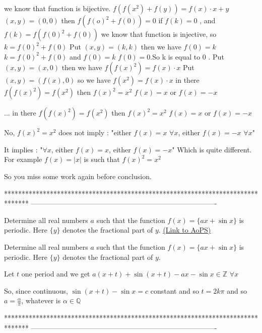 \begin{solution}
	we know that function is bijective.
$  f(f(x^2) + f(y)) = f(x) \cdot x +y  $
$  (x,y) = (0,0) $ then  $ f(f(o)^2 + f(0)) =0 $
if $ f(k)= 0 $ , and $ f(k) = f(f(0)^2 + f(0)) $ we know that function is injective, so  $ k= f(0)^2 + f(0)  $
Put $ (x,y) = (k,k) $ then we have  $ f(0) = k $ 
 $ k= f(0)^2 + f(0)  $ and  $ f(0) =k $
$ f(0)= 0 $.So k is equal to 0 .
    Put $ (x,y) = (x,0) $ then we have 
$ f(f(x)^2)= f(x) \cdot x $  
    Put    $ (x,y) =(f(x) ,0) $ so we have $ f(x^2)= f(x) \cdot x $
in there $ f(f(x)^2) = f(x^2) $  then   $ f(x)^2 = x^2  $ 
$ f(x) = x $ or $ f(x) =-x $
\end{solution}



\begin{solution}
	\begin{tcolorbox}...
in there $ f(f(x)^2) = f(x^2) $  then   $ f(x)^2 = x^2  $ 
$ f(x) = x $ or $ f(x) =-x $\end{tcolorbox}
No, $f(x)^2=x^2$ does not imply : "either $f(x)=x$ $\forall x$, either $f(x)=-x$ $\forall x$"

It implies : "$\forall x$, either $f(x)=x$, either $f(x)=-x$"
Which is quite different. For example $f(x)=|x|$ is such that $f(x)^2=x^2$

So you miss some work again before conclusion.
\end{solution}
*******************************************************************************
-------------------------------------------------------------------------------

\begin{problem}
	Determine all real numbers $a$ such that the function $f(x)=\{ax+\sin x\}$ is periodic. Here $\{y\}$ denotes the fractional part of $y$.
	\flushright \href{https://artofproblemsolving.com/community/c6h566090}{(Link to AoPS)}
\end{problem}



\begin{solution}
	\begin{tcolorbox}Determine all real numbers $a$ such that the function $f(x)=\{ax+\sin x\}$ is periodic. Here $\{y\}$ denotes the fractional part of $y$.\end{tcolorbox}
Let $t$ one period and we get $a(x+t)+\sin(x+t)-ax-\sin x\in\mathbb Z$ $\forall x$

So, since continuous, $\sin(x+t)-\sin x=c$ constant and so $t=2k\pi$ and so $\boxed{a=\frac{\alpha}{\pi}}$, whatever is $\alpha\in\mathbb Q$
\end{solution}
*******************************************************************************
-------------------------------------------------------------------------------

